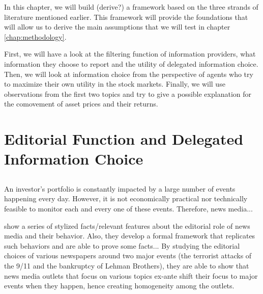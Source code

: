 In this chapter, we will build (derive?) a framework based on the three strands of literature mentioned earlier. This framework will provide the foundations that will allow us to derive the main assumptions that we will test in chapter \ref{chap:methodology}.

First, we will have a look at the filtering function of information providers, what information they choose to report and the utility of delegated information choice.
Then, we will look at information choice from the perspective of agents who try to maximize their own utility in the stock markets.
Finally, we will use observations from the first two topics and try to give a possible explanation for the comovement of asset prices and their returns.


\section{Editorial Function and Delegated Information Choice}

\subsection{\textcite{Nimark2014}}





\subsection{\textcite{Nimark2019}}

An investor's portfolio is constantly impacted by a large number of events happening every day. However, it is not economically practical nor technically feasible to monitor each and every one of these events. Therefore, news media... 

\textcite{Nimark2019} show a series of stylized facts/relevant features about the editorial role of news media and their behavior. Also, they develop a formal framework that replicates such behaviors and are able to prove some facts...
By studying the editorial choices of various newspapers around two major events (the terrorist attacks of the 9/11 and the bankruptcy of Lehman Brothers), they are able to show that news media outlets that focus on various topics ex-ante shift their focus to major events when they happen, hence creating homogeneity among the outlets.

